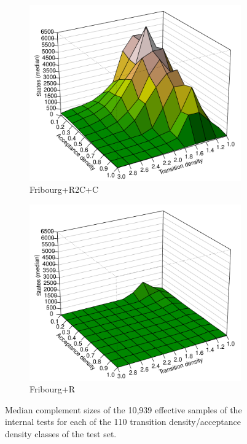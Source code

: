 \begin{figure}[ht]
  \hfill
  \begin{subfigure}[t]{\perspwidth\textwidth}
  \centering
  \includegraphics[width=\textwidth]{figures/r/internal/goal/s.median.Fribourg+R2C+C.pdf}
  \caption{Fribourg+R2C+C}
  \end{subfigure}
  \hfill
  \begin{subfigure}[t]{\perspwidth\textwidth}
  \centering
  \includegraphics[width=\textwidth]{figures/r/internal/goal/s.median.Fribourg+R.pdf}
  \caption{Fribourg+R}
  \end{subfigure}
  \hfill  
\caption{Median complement sizes of the 10,939 effective samples of the internal tests for each of the 110 transition density/acceptance density classes of the \goal{} test set.}
\label{i.g.persp_1}
\end{figure}

